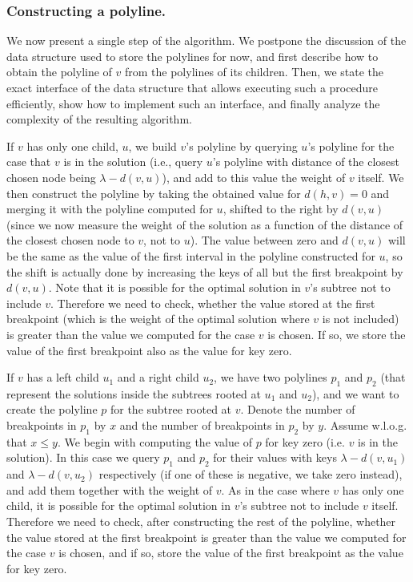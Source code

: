 \documentclass[11pt,a4paper]{article}
\theoremstyle{definition}
\theoremstyle{remark}
\begin{document}
\subsubsection{Constructing a polyline.} We now present a single step of the algorithm. We postpone the discussion of the data structure used to store the polylines for now, and first describe how to obtain the polyline of $v$ from the polylines of its children. Then, we state the exact interface of the data structure that allows executing such a procedure efficiently, show how to implement such an interface, and finally analyze the complexity of the resulting algorithm.

If $v$ has only one child, $u$, we build $v$'s polyline by querying $u$'s polyline for the case that $v$ is in the solution (i.e., query $u$'s polyline with distance of the closest chosen node being $\lambda-d(v,u)$), and add to this value the weight of $v$ itself. We then construct the polyline by taking the obtained value for $d(h,v)=0$ and merging it with the polyline computed for $u$, shifted to the right by $d(v,u)$ (since we now measure the weight of the solution as a function of the distance of the closest chosen node to $v$, not to $u$). The value between zero and $d(v,u)$ will be the same as the value of the first interval in the polyline constructed for $u$, so the shift is actually done by increasing the keys of all but the first breakpoint by $d(v,u)$. Note that it is possible for the optimal solution in $v$'s subtree not to include $v$. Therefore we need to check, whether the value stored at the first breakpoint (which is the weight of the optimal solution where $v$ is not included) is greater than the value we computed for the case $v$ is chosen. If so, we store the value of the first breakpoint also as the value for key zero.

If $v$ has a left child $u_1$ and a right child  $u_2$, we have two polylines $p_1$ and $p_2$ (that represent the solutions inside the subtrees rooted at $u_1$ and $u_2$), and we want to create the polyline $p$ for the subtree rooted at $v$. Denote the number of breakpoints in $p_1$ by $x$ and the number of breakpoints in $p_2$ by $y$. Assume w.l.o.g. that $x \leq y$.
%
We begin with computing the value of $p$ for key zero (i.e. $v$ is in the solution). In this case we query $p_1$ and $p_2$ for their values with keys $\lambda - d(v,u_1)$ and $\lambda - d(v,u_2)$ respectively (if one of these is negative, we take zero instead), and add them together with the weight of $v$. As in the case where $v$ has only one child, it is possible for the optimal solution in $v$'s subtree not to include $v$ itself. Therefore we need to check, after constructing the rest of the polyline, whether the value stored at the first breakpoint is greater than the value we computed for the case $v$ is chosen, and if so, store the value of the first breakpoint as the value for key zero.%
\end{document}
